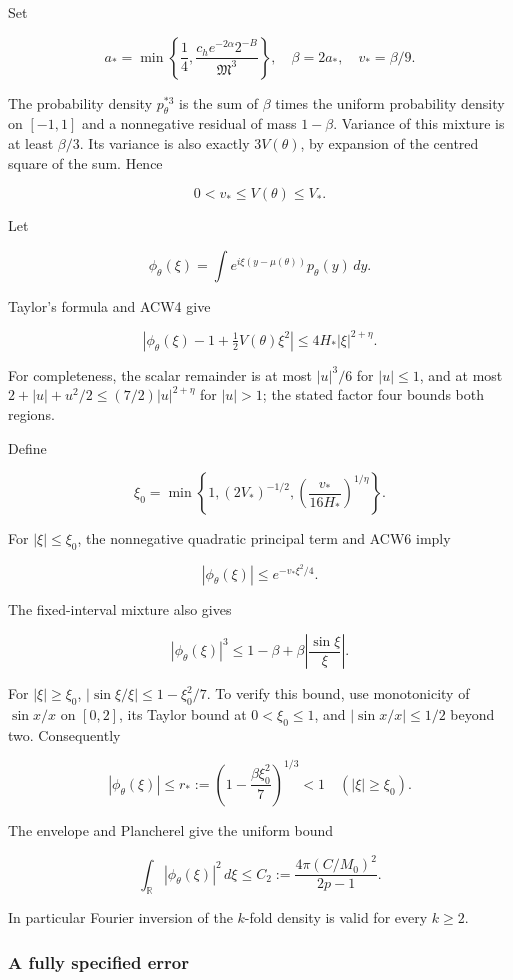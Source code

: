 Set

\[
a_* = \min\left\{\frac14,
\frac{c_h e^{-2\alpha}2^{-B}}{\mathfrak M^3}\right\},
\quad \beta=2a_*,\quad v_* = \beta/9.
\tag{ACW5}
\]

The probability density \(p_\theta^{*3}\) is the sum of \(\beta\) times the uniform probability density on \([-1,1]\) and a nonnegative residual of mass \(1-\beta\). Variance of this mixture is at least \(\beta/3\). Its variance is also exactly \(3V(\theta)\), by expansion of the centred square of the sum. Hence

\[
0<v_*\le V(\theta)\le V_*.
\]

Let

\[
\phi_\theta(\xi)=\int e^{i\xi(y-\mu(\theta))}p_\theta(y)\,dy.
\]

Taylor's formula and ACW4 give

\[
\left|\phi_\theta(\xi)-1+\tfrac12V(\theta)\xi^2\right|
\le4H_*|\xi|^{2+\eta}.
\tag{ACW6}
\]

For completeness, the scalar remainder is at most \(|u|^3/6\) for \(|u|\le1\), and at most \(2+|u|+u^2/2\le(7/2)|u|^{2+\eta}\) for \(|u|>1\); the stated factor four bounds both regions.

Define

\[
\xi_0=\min\left\{1,(2V_*)^{-1/2},
\left(\frac{v_*}{16H_*}\right)^{1/\eta}\right\}.
\]

For \(|\xi|\le\xi_0\), the nonnegative quadratic principal term and ACW6 imply

\[
|\phi_\theta(\xi)|\le e^{-v_*\xi^2/4}.
\tag{ACW7}
\]

The fixed-interval mixture also gives

\[
|\phi_\theta(\xi)|^3\le1-\beta+\beta\left|\frac{\sin\xi}{\xi}\right|.
\]

For \(|\xi|\ge\xi_0\),
\(|\sin\xi/\xi|\le1-\xi_0^2/7\). To verify this bound, use monotonicity of \(\sin x/x\) on \([0,2]\), its Taylor bound at \(0<\xi_0\le1\), and \(|\sin x/x|\le1/2\) beyond two. Consequently

\[
|\phi_\theta(\xi)|\le r_*
:=\left(1-\frac{\beta\xi_0^2}{7}\right)^{1/3}<1
\quad(|\xi|\ge\xi_0).
\tag{ACW8}
\]

The envelope and Plancherel give the uniform bound

\[
\int_{\mathbb R}|\phi_\theta(\xi)|^2\,d\xi
\le C_2:=\frac{4\pi(C/M_0)^2}{2p-1}.
\tag{ACW9}
\]

In particular Fourier inversion of the \(k\)-fold density is valid for every \(k\ge2\).

\subsubsection{A fully specified error}\label{a-fully-specified-error}

